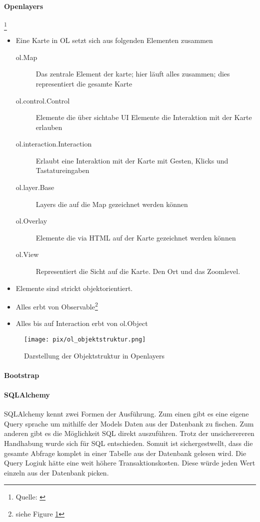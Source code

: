 \documentclass[a4paper,10pt]{article}
\begin{document}
\paragraph{Openlayers} \footnote{Quelle: \cite{ol3begGuide}}

\begin{itemize}
 \item Eine Karte in OL setzt sich aus folgenden Elementen zusammen
 \begin{description}
  \item [ol.Map]   Das zentrale Element der karte; hier läuft alles zusammen; dies representiert die gesamte Karte
  \item [ol.control.Control] Elemente die über sichtabe UI Elemente die Interaktion mit der Karte erlauben
  \item [ol.interaction.Interaction] Erlaubt eine Interaktion mit der Karte mit Gesten, Klicks und Tastatureingaben
  \item [ol.layer.Base]  Layers die auf die Map gezeichnet werden können
  \item [ol.Overlay] Elemente die via HTML auf der Karte gezeichnet werden können
  \item [ol.View] Representiert die Sicht auf die Karte. Den Ort und das Zoomlevel.
 \end{description}
\item Elemente sind strickt objektorientiert. 
\item Alles erbt von Observable\footnote{siehe Figure \ref{fig:ol.objektstruktur}}
\item Alles bis auf Interaction erbt von ol.Object
\end{itemize}

\begin{figure}[h!]
 \centering
 \texttt{[image: pix/ol\_objektstruktur.png]}
 \caption{Darstellung der Objektstruktur in Openlayers}
 \label{fig:ol.objektstruktur}
\end{figure}



\paragraph{Bootstrap}

\paragraph{SQLAlchemy}\label{par:anforderungen-SQLAlchemy}

SQLAlchemy kennt zwei Formen der Ausführung. Zum einen gibt es eine eigene Query sprache um mithilfe der Models Daten aus der Datenbank zu fischen. Zum  anderen gibt es die Möglichkeit SQL direkt auszuführen. Trotz der unsicherereren Handhabung wurde sich für SQL entschieden.  Somuit ist sichergestwellt, dass die gesamte Abfrage komplet in einer Tabelle aus der Datenbank gelesen wird. Die Query Logiuk hätte eine weit höhere Transaktionskosten. Diese würde jeden Wert einzeln aus der Datenbank picken.  %
\end{document}
